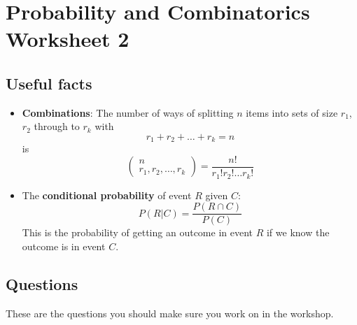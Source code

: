 \documentclass[11pt,a4paper]{scrartcl}
\begin{document}
\section*{Probability and Combinatorics Worksheet 2}

\subsection*{Useful facts}

\begin{itemize}
\item \textbf{Combinations}: The number of ways of splitting $n$ items into sets of size $r_1$, $r_2$ through to $r_k$ with
  \begin{equation}
    r_1+r_2+\ldots+r_k=n
  \end{equation}
  is
\begin{equation}
\left(\begin{array}{c}n\\r_1,r_2,\ldots,r_k\end{array}\right)=\frac{n!}{r_1!r_2!\ldots r_k!} 
\end{equation}

\item The \textbf{conditional probability} of event $R$ given $C$:
  \begin{equation}
P(R|C)=\frac{P(R\cap C)}{P(C)} 
  \end{equation}
  This is the probability of getting an outcome in event $R$ if we
  know the outcome is in event $C$.

  \end{itemize}

\subsection*{Questions}

These are the questions you should make sure you work on in the workshop.
\end{document}
